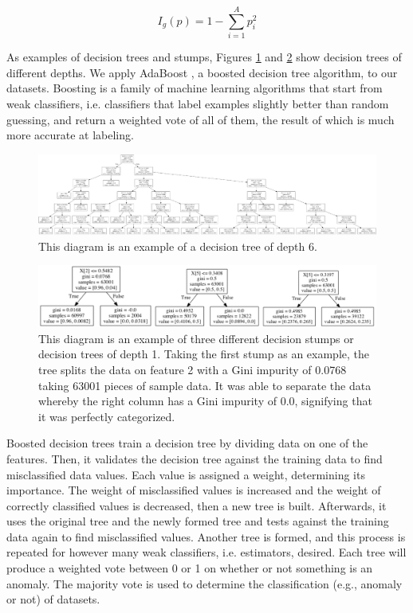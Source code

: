 \documentclass[5p]{elsarticle}
\begin{document}
\begin{equation} I_g(p)=1-\sum_{i=1}^{A}p_i^2 
\end{equation}

As examples of decision trees and stumps, Figures \ref{fig:tree} and \ref{fig:stumps} show decision trees of different depths.	
We apply AdaBoost \cite{deset}, a boosted decision tree algorithm, to our datasets. Boosting is a family of machine learning algorithms that start from weak classifiers, i.e. classifiers that label examples slightly better than random guessing, and return a weighted vote of all of them, the result of which is much more accurate at labeling.

\begin{figure}[htbp]
    \centering
    \includegraphics[width=\textwidth]{tree.png}
    \caption{This diagram is an example of a decision tree of depth 6.}
    \label{fig:tree}
\end{figure}

\begin{figure}[htbp]
    \centering
    \includegraphics[width=\linewidth]{stumps.png}
    \caption{This diagram is an example of three different decision stumps or decision trees of depth 1. Taking the first stump as an example, the tree splits the data on feature 2 with a Gini impurity of 0.0768 taking 63001 pieces of sample data. It was able to separate the data whereby the right column has a Gini impurity of 0.0, signifying that it was perfectly categorized.}
    \label{fig:stumps}
\end{figure}

Boosted decision trees train a decision tree by dividing data on one of the features. Then, it validates the decision tree against the training data to find misclassified data values. Each value is assigned a weight, determining its importance. The weight of misclassified values is increased and the weight of correctly classified values is decreased, then a new tree is built. Afterwards, it uses the original tree and the newly formed tree and tests against the training data again to find misclassified values. Another tree is formed, and this process is repeated for however many weak classifiers, i.e. estimators, desired. Each tree will produce a weighted vote between 0 or 1 on whether or not something is an anomaly. The majority vote is used to determine the classification (e.g., anomaly or not) of datasets.
\end{document}
